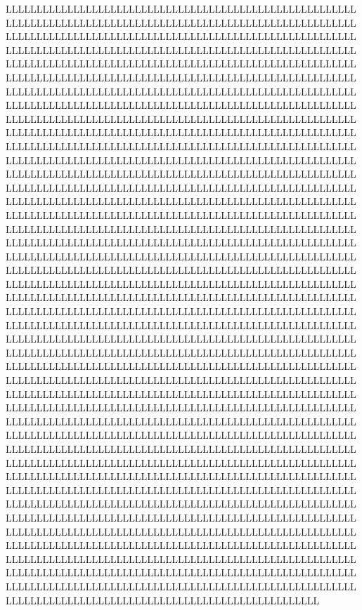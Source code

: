 LLL LLL LLL LLL LLL LLL LLL LLL LLL LLL LLL LLL LLL LLL LLL LLL LLL LLL LLL LLL LLL LLL LLL LLL LLL LLL LLL LLL LLL LLL LLL LLL LLL LLL LLL LLL LLL LLL LLL LLL LLL LLL LLL LLL LLL LLL LLL LLL LLL LLL LLL LLL LLL LLL LLL LLL LLL LLL LLL LLL LLL LLL LLL LLL LLL LLL LLL LLL LLL LLL LLL LLL LLL LLL LLL LLL LLL LLL LLL LLL LLL LLL LLL LLL LLL LLL LLL LLL LLL LLL LLL LLL LLL LLL LLL LLL LLL LLL LLL LLL LLL LLL LLL LLL LLL LLL LLL LLL LLL LLL LLL LLL LLL LLL LLL LLL LLL LLL LLL LLL LLL LLL LLL LLL LLL LLL LLL LLL LLL LLL LLL LLL LLL LLL LLL LLL LLL LLL LLL LLL LLL LLL LLL LLL LLL LLL LLL LLL LLL LLL LLL LLL LLL LLL LLL LLL LLL LLL LLL LLL LLL LLL LLL LLL LLL LLL LLL LLL LLL LLL LLL LLL LLL LLL LLL LLL LLL LLL LLL LLL LLL LLL LLL LLL LLL LLL LLL LLL LLL LLL LLL LLL LLL LLL LLL LLL LLL LLL LLL LLL LLL LLL LLL LLL LLL LLL LLL LLL LLL LLL LLL LLL LLL LLL LLL LLL LLL LLL LLL LLL LLL LLL LLL LLL LLL LLL LLL LLL LLL LLL LLL LLL LLL LLL LLL LLL LLL LLL LLL LLL LLL LLL LLL LLL LLL LLL LLL LLL LLL LLL LLL LLL LLL LLL LLL LLL LLL LLL LLL LLL LLL LLL LLL LLL LLL LLL LLL LLL LLL LLL LLL LLL LLL LLL LLL LLL LLL LLL LLL LLL LLL LLL LLL LLL LLL LLL LLL LLL LLL LLL LLL LLL LLL LLL LLL LLL LLL LLL LLL LLL LLL LLL LLL LLL LLL LLL LLL LLL LLL LLL LLL LLL LLL LLL LLL LLL LLL LLL LLL LLL LLL LLL LLL LLL LLL LLL LLL LLL LLL LLL LLL LLL LLL LLL LLL LLL LLL LLL LLL LLL LLL LLL LLL LLL LLL LLL LLL LLL LLL LLL LLL LLL LLL LLL LLL LLL LLL LLL LLL LLL LLL LLL LLL LLL LLL LLL LLL LLL LLL LLL LLL LLL LLL LLL LLL LLL LLL LLL LLL LLL LLL LLL LLL LLL LLL LLL LLL LLL LLL LLL LLL LLL LLL LLL LLL LLL LLL LLL LLL LLL LLL LLL LLL LLL LLL LLL LLL LLL LLL LLL LLL LLL LLL LLL LLL LLL LLL LLL LLL LLL LLL LLL LLL LLL LLL LLL LLL LLL LLL LLL LLL LLL LLL LLL LLL LLL LLL LLL LLL LLL LLL LLL LLL LLL LLL LLL LLL LLL LLL LLL LLL LLL LLL LLL LLL LLL LLL LLL LLL LLL LLL LLL LLL LLL LLL LLL LLL LLL LLL LLL LLL LLL LLL LLL LLL LLL LLL LLL LLL LLL LLL LLL LLL LLL LLL LLL LLL LLL LLL LLL LLL LLL LLL LLL LLL LLL LLL LLL LLL LLL LLL LLL LLL LLL LLL LLL LLL LLL LLL LLL LLL LLL LLL LLL LLL LLL LLL LLL LLL LLL LLL LLL LLL LLL LLL LLL LLL LLL LLL LLL LLL LLL LLL LLL LLL LLL LLL LLL LLL LLL LLL LLL LLL LLL LLL LLL LLL LLL LLL LLL LLL LLL LLL LLL LLL LLL LLL LLL LLL LLL LLL LLL LLL LLL LLL LLL LLL LLL LLL LLL LLL LLL LLL LLL LLL LLL LLL LLL LLL LLL LLL LLL LLL LLL LLL LLL LLL LLL LLL LLL LLL LLL LLL LLL LLL LLL LLL LLL LLL LLL LLL LLL LLL LLL LLL LLL LLL LLL LLL LLL LLL LLL LLL LLL LLL LLL LLL LLL LLL LLL LLL LLL LLL LLL LLL LLL LLL LLL LLL LLL LLL LLL LLL LLL LLL LLL LLL LLL LLL LLL LLL LLL LLL LLL LLL LLL LLL LLL LLL LLL LLL LLL LLL LLL LLL LLL LLL LLL LLL LLL LLL LLL LLL LLL LLL LLL LLL LLL LLL LLL LLL LLL LLL LLL LLL LLL LLL LLL LLL LLL LLL LLL LLL LLL LLL LLL LLL LLL LLL LLL LLL LLL LLL LLL LLL LLL LLL LLL LLL LLL LLL LLL LLL LLL LLL LLL LLL LLL LLL LLL LLL LLL LLL LLL LLL LLL LLL LLL LLL LLL LLL LLL LLL LLL LLL LLL LLL LLL LLL LLL LLL LLL LLL LLL LLL LLL LLL LLL LLL LLL LLL LLL LLL LLL LLL LLL LLL LLL LLL LLL LLL LLL LLL LLL LLL LLL LLL LLL LLL LLL LLL LLL LLL LLL LLL LLL LLL LLL LLL LLL LLL LLL LLL LLL LLL LLL LLL LLL LLL LLL LLL LLL LLL LLL LLL LLL LLL LLL LLL LLL LLL LLL LLL LLL LLL LLL LLL LLL LLL LLL LLL LLL LLL LLL LLL LLL LLL LLL LLL LLL LLL LLL LLL LLL LLL LLL LLL LLL LLL LLL LLL LLL LLL LLL LLL LLL LLL LLL LLL LLL LLL LLL LLL LLL 